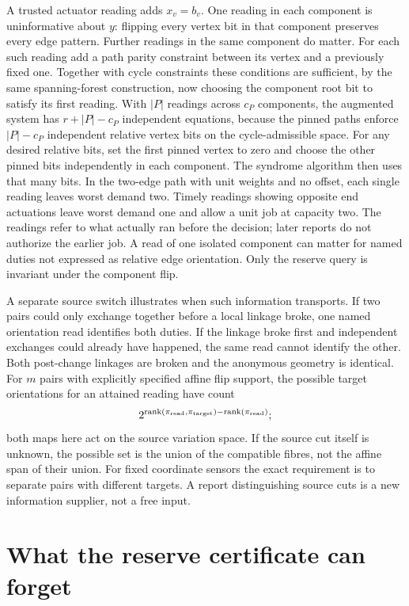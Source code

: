 \documentclass[11pt]{article}
\begin{document}
A trusted actuator reading adds \(x_v=b_v\). One reading in each component
is uninformative about \(y\): flipping every vertex bit in that component
preserves every edge pattern. Further readings in the same component do
matter. For each such reading add a path parity constraint between its
vertex and a previously fixed one. Together with cycle constraints these
conditions are sufficient, by the same spanning-forest construction,
now choosing the component root bit to satisfy its first reading. With
\(|P|\) readings across \(c_P\) components, the augmented system has
\(r+|P|-c_P\) independent equations, because the pinned paths enforce
\(|P|-c_P\) independent relative vertex bits on the cycle-admissible space.
For any desired relative bits, set the first pinned vertex to zero and
choose the other pinned bits independently in each component. The
syndrome algorithm then uses that many bits.
In the two-edge path with unit weights and no offset, each single reading
leaves worst demand two. Timely readings showing opposite end actuations
leave worst demand one and allow a unit job at capacity two. The readings
refer to what actually ran before the decision; later reports do not
authorize the earlier job. A read of one isolated component can matter
for named duties not expressed as relative edge orientation. Only the
reserve query is invariant under the component flip.

A separate source switch illustrates when such information transports.
If two pairs could only exchange together before a local linkage broke,
one named orientation read identifies both duties. If the linkage broke
first and independent exchanges could already have happened, the same
read cannot identify the other. Both post-change linkages are broken and
the anonymous geometry is identical. For \(m\) pairs with explicitly
specified affine flip support, the possible target orientations for an
attained reading have count
\[
  2^{\operatorname{rank}(\pi_{\rm read},\pi_{\rm target})
       -\operatorname{rank}(\pi_{\rm read})};
\]
both maps here act on the source variation space. If the source cut itself
is unknown, the possible set is the union of the compatible fibres, not
the affine span of their union. For fixed coordinate sensors the exact
requirement is to separate pairs with different targets. A report
distinguishing source cuts is a new information supplier, not a free input.

\section{What the reserve certificate can forget}
\end{document}

